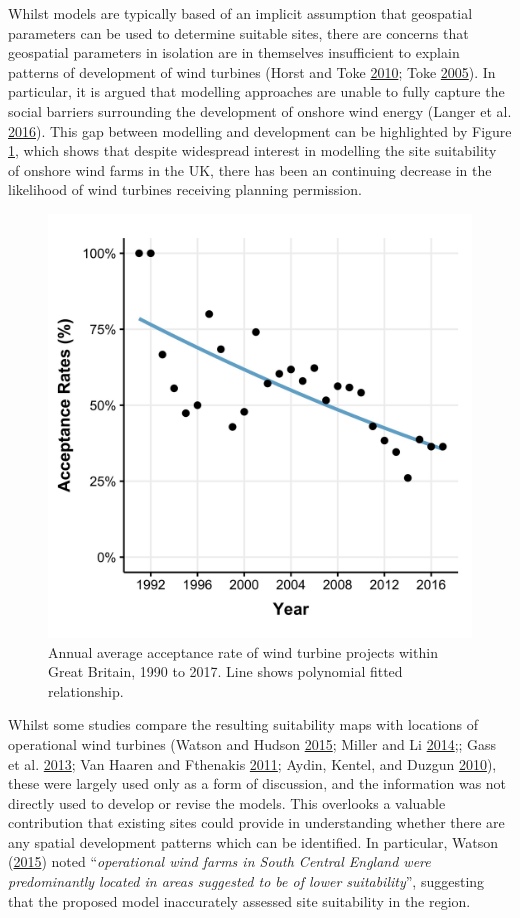 \documentclass[a4paper,]{article}
\theoremstyle{definition}
\theoremstyle{definition}
\theoremstyle{definition}
\theoremstyle{remark}
\begin{document}
Whilst models are typically based of an implicit assumption that
geospatial parameters can be used to determine suitable sites, there are
concerns that geospatial parameters in isolation are in themselves
insufficient to explain patterns of development of wind turbines (Horst
and Toke \protect\hyperlink{ref-VanderHorst2010}{2010}; Toke
\protect\hyperlink{ref-Toke2005}{2005}). In particular, it is argued
that modelling approaches are unable to fully capture the social
barriers surrounding the development of onshore wind energy (Langer et
al. \protect\hyperlink{ref-Langer2016}{2016}). This gap between
modelling and development can be highlighted by Figure
\ref{fig:acceptanceRatesWind}, which shows that despite widespread
interest in modelling the site suitability of onshore wind farms in the
UK, there has been an continuing decrease in the likelihood of wind
turbines receiving planning permission.

\begin{figure}[h]

{\centering \includegraphics[width=0.5\linewidth]{figures/figure3} 

}

\caption{Annual average acceptance rate of wind turbine projects within Great Britain, 1990 to 2017. Line shows polynomial fitted relationship.}\label{fig:acceptanceRatesWind}
\end{figure}

Whilst some studies compare the resulting suitability maps with
locations of operational wind turbines (Watson and Hudson
\protect\hyperlink{ref-Watson2015}{2015}; Miller and Li
\protect\hyperlink{ref-Miller2014}{2014};; Gass et al.
\protect\hyperlink{ref-Gass2013}{2013}; Van Haaren and Fthenakis
\protect\hyperlink{ref-VanHaaren2011}{2011}; Aydin, Kentel, and Duzgun
\protect\hyperlink{ref-Aydin2010}{2010}), these were largely used only
as a form of discussion, and the information was not directly used to
develop or revise the models. This overlooks a valuable contribution
that existing sites could provide in understanding whether there are any
spatial development patterns which can be identified. In particular,
Watson (\protect\hyperlink{ref-Watson2015}{2015}) noted
``\emph{operational wind farms in South Central England were
predominantly located in areas suggested to be of lower suitability}'',
suggesting that the proposed model inaccurately assessed site
suitability in the region.
\end{document}
